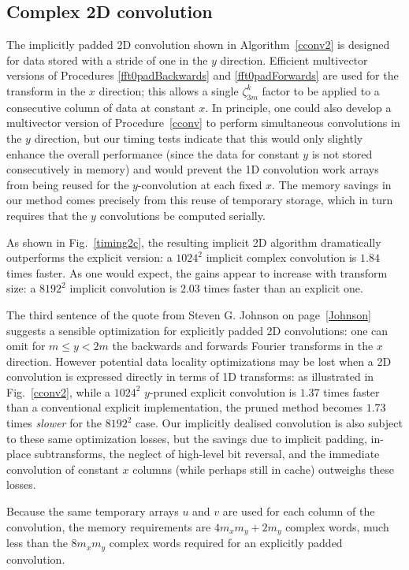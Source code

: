 \documentclass[final]{siamltex}
\begin{document}
\subsection{Complex 2D convolution}
The implicitly padded 2D convolution shown in Algorithm~\ref{cconv2} 
is designed for data stored with a stride of one in the $y$
direction. Efficient multivector versions of Procedures \ref{fft0padBackwards}
and \ref{fft0padForwards} are used for the transform in the $x$ direction;
this allows a single $\zeta_{3m}^k$ factor to be applied to a consecutive
column of data at constant $x$. In principle, one could also develop a
multivector version of Procedure~\ref{cconv} to perform simultaneous
convolutions in the $y$ direction, but our timing tests indicate that this
would only slightly enhance the overall performance (since the data for constant
$y$ is not stored consecutively in memory) and would prevent the 1D convolution
work arrays from being reused for the $y$-convolution at each fixed $x$. The
memory savings in our method comes precisely from this reuse of temporary
storage, which in turn requires that the $y$ convolutions be computed
serially.

As shown in Fig.~\ref{timing2c}, the resulting implicit
2D algorithm dramatically outperforms the explicit version:
a $1024^2$ implicit complex convolution is $1.84$ times faster.
As one would expect, the gains appear to increase with transform size: a
$8192^2$ implicit convolution is $2.03$ times faster than an explicit one. 

The third sentence of the quote from Steven G. Johnson on
page~\ref{Johnson} suggests a sensible optimization for
explicitly padded 2D convolutions: one can omit for $m \le y < 2m$
the backwards and forwards Fourier transforms in the $x$ direction.
However potential data locality optimizations may be lost
when a 2D convolution is expressed directly in terms of 1D transforms: as
illustrated in Fig.~\ref{cconv2}, while a $1024^2$ $y$-pruned explicit
convolution is $1.37$ times faster than a conventional explicit
implementation, the pruned method becomes $1.73$ times {\it slower} for the
$8192^2$ case. Our implicitly dealised convolution is also subject
to these same optimization losses, but the savings due to implicit padding,
in-place subtransforms, the neglect of high-level bit reversal, and the
immediate convolution of constant $x$ columns (while perhaps still in
cache) outweighs these losses.

Because the same temporary arrays $u$ and $v$ are used for each column
of the convolution, the memory requirements are $4m_xm_y+2m_y$ complex
words, much less than the $8m_xm_y$ complex words required for an
explicitly padded convolution.
\end{document}
